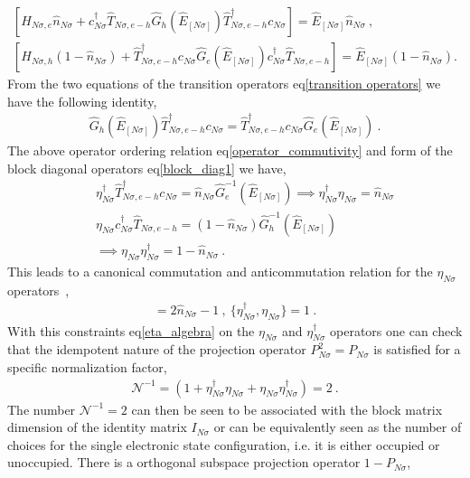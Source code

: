 \documentclass[12pt,a4paper]{article}
\begin{document}
\begin{eqnarray}
\left[H_{N\sigma,e}\hat{n}_{N\sigma}+c^{\dagger}_{N\sigma}\hat{T}_{N\sigma,e-h}\hat{G}_{h}(\hat{E}_{[N\sigma]})\hat{T}^{\dagger}_{N\sigma,e-h}c_{N\sigma}\right] = \hat{E}_{[N\sigma]}\hat{n}_{N\sigma}~,~\nonumber\\
\left[H_{N\sigma,h}(1-\hat{n}_{N\sigma})+\hat{T}^{\dagger}_{N\sigma,e-h}c_{N\sigma}\hat{G}_{e}(\hat{E}_{[N\sigma]})c^{\dagger}_{N\sigma}\hat{T}_{N\sigma,e-h}\right]= \hat{E}_{[N\sigma]}(1-\hat{n}_{N\sigma}). 
\label{block_diag1}
\end{eqnarray}
From the two equations of the transition operators eq\eqref{transition operators} we have the following identity,
\begin{eqnarray}
\hat{G}_{h}(\hat{E}_{[N\sigma]})\hat{T}^{\dagger}_{N\sigma,e-h}c_{N\sigma} = \hat{T}^{\dagger}_{N\sigma,e-h}c_{N\sigma}\hat{G}_{e}(\hat{E}_{[N\sigma]})~.
\label{operator_commutivity}
\end{eqnarray}
The above operator ordering relation eq\eqref{operator_commutivity} and form of the block diagonal operators eq\eqref{block_diag1} we have,
\begin{eqnarray}
&&\eta^{\dagger}_{N\sigma}\hat{T}_{N\sigma,e-h}^{\dagger}c_{N\sigma} =\hat{n}_{N\sigma}\hat{G}^{-1}_{e}(\hat{E}_{[N\sigma]}) \implies \eta^{\dagger}_{N\sigma}\eta_{N\sigma} =\hat{n}_{N\sigma}\nonumber\\
&&\eta_{N\sigma}c^{\dagger}_{N\sigma}\hat{T}_{N\sigma,e-h}=(1-\hat{n}_{N\sigma})\hat{G}^{-1}_{h}(\hat{E}_{[N\sigma]})\nonumber\\
&&\implies \eta_{N\sigma}\eta^{\dagger}_{N\sigma} =1-\hat{n}_{N\sigma}~.\nonumber
\end{eqnarray}
This leads to a canonical commutation and anticommutation relation for the $\eta_{N\sigma}$ operators~,~
\begin{align}
[\eta^{\dagger}_{N\sigma},\eta_{N\sigma}]=2\hat{n}_{N\sigma}-1~,~\lbrace\eta^{\dagger}_{N\sigma},\eta_{N\sigma}\rbrace = 1~.\label{eta_algebra}
\end{align}
With this constraints eq\eqref{eta_algebra} on the $\eta_{N\sigma}$ and $\eta^{\dagger}_{N\sigma}$ operators one can check that the idempotent nature of the projection operator $P^{2}_{N\sigma}=P_{N\sigma}$ is satisfied for a specific normalization factor,
\begin{eqnarray}
\mathcal{N}^{-1} = (1+\eta^{\dagger}_{N\sigma}\eta_{N\sigma}+\eta_{N\sigma}\eta^{\dagger}_{N\sigma})=2~.
\end{eqnarray} 
The number $\mathcal{N}^{-1}=2$ can then be seen to be associated with the block matrix dimension of the identity matrix $I_{N\sigma}$ or can be equivalently seen as the number of choices for the single electronic state configuration, i.e. it is either occupied or unoccupied. There is a orthogonal subspace projection operator $1-P_{N\sigma}$,
\end{document}
